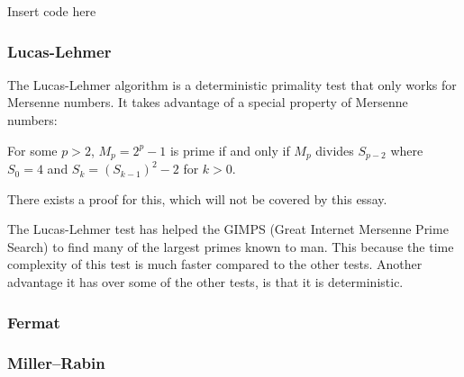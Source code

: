 \documentclass[main.tex]{subfiles}
\begin{document}
\begin{python}
    Insert code here
\end{python}

\subsubsection{Lucas-Lehmer}
The Lucas-Lehmer algorithm is a deterministic primality test that only works for Mersenne numbers. It takes advantage of a special property of Mersenne numbers:

\begin{mdframed}
    For some $p>2$, $M_p=2^p-1$ is prime if and only if $M_p$ divides $S_{p-2}$ where $S_0=4$ and $S_k=(S_{k-1})^2-2$ for $k>0$. 
\end{mdframed}

There exists a proof for this, which will not be covered by this essay.

The Lucas-Lehmer test has helped the GIMPS (Great Internet Mersenne Prime Search) to find many of the largest primes known to man. This because the time complexity of this test is much faster compared to the other tests. Another advantage it has over some of the other tests, is that it is deterministic.

\subsubsection{Fermat}

\subsubsection{Miller–Rabin}
\end{document}
